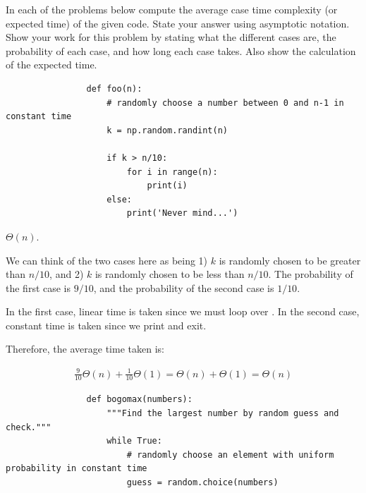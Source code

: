 \begin{prob}
    In each of the problems below compute the average case time complexity (or
    expected time) of the given code. State your answer using asymptotic
    notation. Show your work for this problem by stating what the different
    cases are, the probability of each case, and how long each case takes. Also
    show the calculation of the expected time.

    \begin{subprobset}
        \begin{subprob}
            \begin{verbatim}
                def foo(n):
                    # randomly choose a number between 0 and n-1 in constant time
                    k = np.random.randint(n)

                    if k > n/10:
                        for i in range(n):
                            print(i)
                    else:
                        print('Never mind...')

            \end{verbatim}

            \begin{soln}
                $\Theta(n)$.

                We can think of the two cases here as being 1) $k$ is randomly chosen
                to be greater than $n/10$, and 2) $k$ is randomly chosen to be less than $n/10$.
                The probability of the first case is $9/10$, and
                the probability of the second case is $1/10$.

                In the first case, linear time is taken since we must loop over .
                In the second case, constant time is taken since we print 
                and exit.

                Therefore, the average time taken is:

                \begin{align*}
                    \frac{9}{10} \Theta(n) + \frac{1}{10} \Theta(1)
                    =
                        \Theta(n) + \Theta(1)
                    =
                        \Theta(n)
                \end{align*}

            \end{soln}
        \end{subprob}


        \begin{subprob}
            \begin{verbatim}
                def bogomax(numbers):
                    """Find the largest number by random guess and check."""
                    while True:
                        # randomly choose an element with uniform probability in constant time
                        guess = random.choice(numbers)


\end{verbatim}
\end{subprob}
\end{subprobset}
\end{prob}
